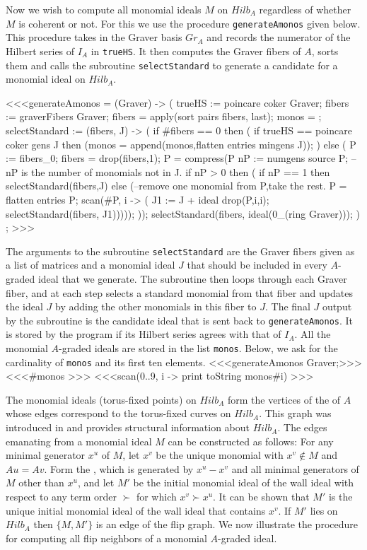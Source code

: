 Now we wish to compute all monomial ideals $M$ on $Hilb_A$ regardless
of whether $M$ is coherent or not. For this we use the procedure
{\tt generateAmonos} given below. This procedure takes in the Graver
basis $Gr_A$ and records the numerator of the Hilbert series of $I_A$
in {\tt trueHS}. It then computes the Graver fibers of $A$, sorts them
and calls the subroutine {\tt selectStandard} to generate a
candidate for a monomial ideal on $Hilb_A$.

<<<generateAmonos = (Graver) -> (
     trueHS := poincare coker Graver;
     fibers := graverFibers Graver;
     fibers = apply(sort pairs fibers, last);
     monos = {};
     selectStandard := (fibers, J) -> (
     if #fibers == 0 then (
        if trueHS == poincare coker gens J
        then (monos = append(monos,flatten entries mingens J));
     ) else (
        P := fibers_0;
        fibers = drop(fibers,1);
        P = compress(P %
        nP := numgens source P; 
        -- nP is the number of monomials not in J.
        if nP > 0 then (
           if nP == 1 then selectStandard(fibers,J)
           else (--remove one monomial from P,take the rest.
                 P = flatten entries P;
                 scan(#P, i -> (
                      J1 := J + ideal drop(P,{i,i});
                      selectStandard(fibers, J1)))));
     ));
     selectStandard(fibers, ideal(0_(ring Graver)));
     ) ; >>>

The arguments to the subroutine {\tt selectStandard}
are the Graver fibers given as a list of matrices and a monomial 
ideal $J$ that should be included in every $A$-graded ideal 
that we generate. The subroutine then loops through each Graver fiber, 
and at each step selects a standard monomial from that fiber and 
updates the ideal $J$ by adding the other monomials in this fiber 
to $J$. The final $J$ output by the subroutine is the candidate ideal
that is sent back to {\tt generateAmonos}. It is stored by the program 
if its Hilbert series agrees with that of $I_A$. 
All the monomial $A$-graded ideals are stored in the list {\tt monos}.
Below, we ask \Mtwo for the cardinality of {\tt monos} and its 
first ten elements.
<<<generateAmonos Graver;>>>
<<<#monos >>>
<<<scan(0..9, i -> print toString monos#i) >>>

The monomial ideals (torus-fixed points) on $Hilb_A$ form the vertices
of the {\it {}} of $A$ whose edges correspond to the
torus-fixed curves on $Hilb_A$. This graph was introduced in \cite{HS:MT}
and provides structural information about $Hilb_A$.  The edges
emanating from a monomial ideal $M$ can be constructed as follows: 
For any minimal generator $x^u$ of $M$, let $x^v$ be the unique
monomial with $x^v \not\in M$ and $Au = Av$. Form the {\it {}},
which is generated by $x^u - x^v$ and all minimal generators of $M$
other than $x^u$, and let $M'$ be the initial monomial ideal of the
wall ideal with respect to any term order $\succ$ for which $x^v \succ
x^u$. It can be shown that $M'$ is the unique initial monomial ideal
of the wall ideal that contains $x^v$.  If $M'$ lies on $Hilb_A$ then
$\{M, M'\}$ is an edge of the flip graph. We now illustrate the \Mtwo
procedure for computing all flip neighbors of a monomial $A$-graded
ideal.
 
